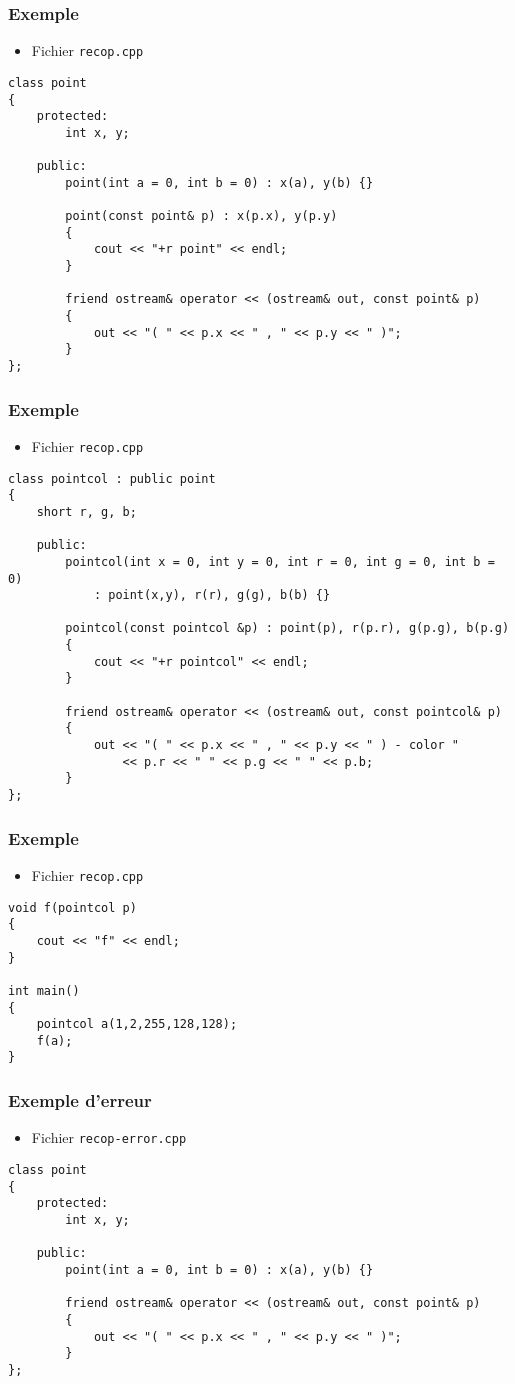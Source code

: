 \begin{frame}[containsverbatim]
\frametitle{Exemple}
\begin{itemize}
\item Fichier \texttt{recop.cpp}
\end{itemize}
\begin{lstlisting}
class point
{
	protected:
		int x, y;
	
	public:
		point(int a = 0, int b = 0) : x(a), y(b) {}

		point(const point& p) : x(p.x), y(p.y) 
		{
			cout << "+r point" << endl;
		}

		friend ostream& operator << (ostream& out, const point& p)
		{
			out << "( " << p.x << " , " << p.y << " )";
		}
};
\end{lstlisting}
\end{frame}

\begin{frame}[containsverbatim]
\frametitle{Exemple}
\begin{itemize}
\item Fichier \texttt{recop.cpp}
\end{itemize}
\begin{lstlisting}
class pointcol : public point
{
	short r, g, b;
	
	public:
		pointcol(int x = 0, int y = 0, int r = 0, int g = 0, int b = 0) 
			: point(x,y), r(r), g(g), b(b) {}		

		pointcol(const pointcol &p) : point(p), r(p.r), g(p.g), b(p.g)
		{
			cout << "+r pointcol" << endl;
		}	

		friend ostream& operator << (ostream& out, const pointcol& p)
		{
			out << "( " << p.x << " , " << p.y << " ) - color " 
			    << p.r << " " << p.g << " " << p.b;
		}
};
\end{lstlisting}
\end{frame}

\begin{frame}[containsverbatim]
\frametitle{Exemple}
\begin{itemize}
\item Fichier \texttt{recop.cpp}
\end{itemize}
\begin{lstlisting}
void f(pointcol p)
{
	cout << "f" << endl;
}

int main()
{
	pointcol a(1,2,255,128,128);
	f(a);
}
\end{lstlisting}
\end{frame}

\begin{frame}[containsverbatim]
\frametitle{Exemple d'erreur}
\begin{itemize}
\item Fichier \texttt{recop-error.cpp}
\end{itemize}
\begin{lstlisting}
class point
{
	protected:
		int x, y;
	
	public:
		point(int a = 0, int b = 0) : x(a), y(b) {}		

		friend ostream& operator << (ostream& out, const point& p)
		{
			out << "( " << p.x << " , " << p.y << " )";
		}
};
\end{lstlisting}
\end{frame}

